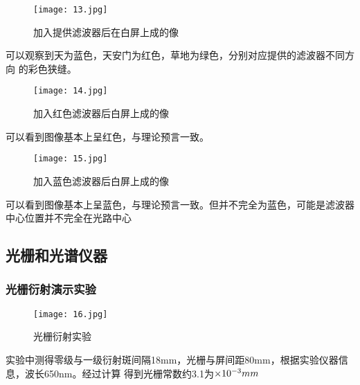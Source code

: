 \documentclass[12pt,a4paper]{article}
\begin{document}
            \begin{figure}[H]
                \centering
                \texttt{[image: 13.jpg]}
                \caption{加入提供滤波器后在白屏上成的像}
            \end{figure}
        可以观察到天为蓝色，天安门为红色，草地为绿色，分别对应提供的滤波器不同方向
        的彩色狭缝。            

            \begin{figure}[H]
                \centering
                \texttt{[image: 14.jpg]}
                \caption{加入红色滤波器后白屏上成的像}
            \end{figure}
        可以看到图像基本上呈红色，与理论预言一致。

        \begin{figure}[H]
            \centering
            \texttt{[image: 15.jpg]}
            \caption{加入蓝色滤波器后白屏上成的像}
        \end{figure}
    可以看到图像基本上呈蓝色，与理论预言一致。但并不完全为蓝色，可能是滤波器中心位置并不完全在光路中心
    \subsection{光栅和光谱仪器}
        \subsubsection{光栅衍射演示实验}
            \begin{figure}[H]
                \centering
                \texttt{[image: 16.jpg]}
                \caption{光栅衍射实验}
            \end{figure}
        实验中测得零级与一级衍射斑间隔18mm，光栅与屏间距80mm，根据实验仪器信息，波长650nm。经过计算
        得到光栅常数约3.1为$ \times {10^{{\rm{ - }}3}}mm$
        
\end{document}

